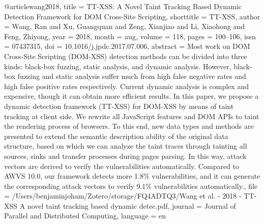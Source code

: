 @article{wang2018,
  title = {{{TT}}-{{XSS}}: {{A}} Novel Taint Tracking Based Dynamic Detection Framework for {{DOM Cross}}-{{Site Scripting}}},
  shorttitle = {{{TT}}-{{XSS}}},
  author = {Wang, Ran and Xu, Guangquan and Zeng, Xianjiao and Li, Xiaohong and Feng, Zhiyong},
  year = {2018},
  month = aug,
  volume = {118},
  pages = {100--106},
  issn = {07437315},
  doi = {10.1016/j.jpdc.2017.07.006},
  abstract = {Most work on DOM Cross-Site Scripting (DOM-XSS) detection methods can be divided into three kinds: black-box fuzzing, static analysis, and dynamic analysis. However, black-box fuzzing and static analysis suffer much from high false negative rates and high false positive rates respectively. Current dynamic analysis is complex and expensive, though it can obtain more efficient results. In this paper, we propose a dynamic detection framework (TT-XSS) for DOM-XSS by means of taint tracking at client side. We rewrite all JavaScript features and DOM APIs to taint the rendering process of browsers. To this end, new data types and methods are presented to extend the semantic description ability of the original data structure, based on which we can analyze the taint traces through tainting all sources, sinks and transfer processes during pages parsing. In this way, attack vectors are derived to verify the vulnerabilities automatically. Compared to AWVS 10.0, our framework detects more 1.8\% vulnerabilities, and it can generate the corresponding attack vectors to verify 9.1\% vulnerabilities automatically.},
  file = {/Users/benjaminjoham/Zotero/storage/FQ4ADTQ3/Wang et al. - 2018 - TT-XSS A novel taint tracking based dynamic detec.pdf},
  journal = {Journal of Parallel and Distributed Computing},
  language = {en}
}


